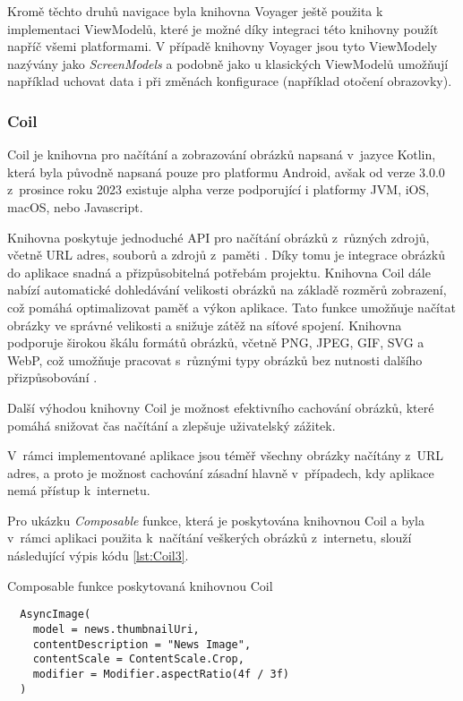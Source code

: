 Kromě těchto druhů navigace byla knihovna Voyager ještě použita k implementaci ViewModelů, které je možné díky integraci této knihovny
použít napříč všemi platformami. V případě knihovny Voyager jsou tyto ViewModely nazývány jako \textit{ScreenModels} a podobně jako u klasických
ViewModelů umožňují například uchovat data i při změnách konfigurace (například otočení obrazovky). \cite{voyagerScreeNmodel}


\subsubsection*{Coil}
Coil je knihovna pro načítání a zobrazování obrázků napsaná v~jazyce Kotlin, která byla původně napsaná pouze pro platformu Android, avšak
od verze 3.0.0 z~prosince roku 2023 existuje alpha verze podporující i platformy JVM, iOS, macOS, nebo Javascript. \cite{coil3} 

\medskip

Knihovna poskytuje jednoduché API pro načítání obrázků
z~různých zdrojů, včetně URL adres, souborů a zdrojů z~paměti \cite{coil}. Díky tomu je integrace obrázků do aplikace snadná a přizpůsobitelná potřebám projektu.
Knihovna Coil dále nabízí automatické dohledávání velikosti obrázků na základě rozměrů zobrazení, což pomáhá optimalizovat paměť a výkon aplikace. Tato funkce 
umožňuje načítat obrázky ve správné velikosti a snižuje zátěž na síťové spojení. Knihovna podporuje širokou škálu formátů obrázků, včetně PNG, 
JPEG, GIF, SVG a WebP, což umožňuje pracovat s~různými typy obrázků bez nutnosti dalšího přizpůsobování \cite{coil}.

Další výhodou knihovny Coil je možnost efektivního cachování obrázků, které pomáhá snižovat čas načítání a zlepšuje uživatelský zážitek.

\medskip

V~rámci implementované aplikace jsou téměř všechny obrázky načítány z~URL adres, a proto je možnost cachování zásadní hlavně v~případech, 
kdy aplikace nemá přístup k~internetu.

Pro ukázku \textit{Composable} funkce, která je poskytována knihovnou Coil a byla v~rámci
aplikaci použita k~načítání veškerých obrázků z~internetu, slouží následující výpis kódu \ref{lst:Coil3}.

\begin{listing}[H]
\caption{Composable funkce poskytovaná knihovnou Coil}\label{lst:Coil3}
\begin{verbatim}
  AsyncImage(
    model = news.thumbnailUri,
    contentDescription = "News Image",
    contentScale = ContentScale.Crop,
    modifier = Modifier.aspectRatio(4f / 3f)
  )
\end{verbatim}
\end{listing}
